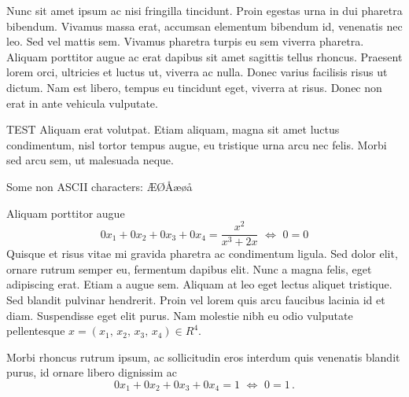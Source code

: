 Nunc sit amet ipsum ac nisi fringilla tincidunt. Proin egestas urna in dui pharetra bibendum. Vivamus massa erat, accumsan elementum bibendum id, venenatis nec leo. Sed vel mattis sem. Vivamus pharetra turpis eu sem viverra pharetra. Aliquam porttitor augue ac erat dapibus sit amet sagittis tellus rhoncus. Praesent lorem orci, ultricies et luctus ut, viverra ac nulla. Donec varius facilisis risus ut dictum. Nam est libero, tempus eu tincidunt eget, viverra at risus. Donec non erat in ante vehicula vulputate.

TEST Aliquam erat volutpat. Etiam aliquam, magna sit amet luctus condimentum, nisl tortor tempus augue, eu tristique urna arcu nec felis. Morbi sed arcu sem, ut malesuada neque.

Some non ASCII characters: ÆØÅæøå

\begin{example}\label{myexample.1}
Aliquam porttitor augue
\begin{equation}
0x_1+0x_2+0x_3+0x_4= \frac{x^2}{x^3+2x}\,\,\Leftrightarrow\,\,0=0
\end{equation}
Quisque et risus vitae mi gravida pharetra ac condimentum ligula. Sed dolor elit, ornare rutrum semper eu, fermentum dapibus elit. Nunc a magna felis, eget adipiscing erat. Etiam a augue sem. Aliquam at leo eget lectus aliquet tristique. Sed blandit pulvinar hendrerit. Proin vel lorem quis arcu faucibus lacinia id et diam. Suspendisse eget elit purus. Nam molestie nibh eu odio vulputate pellentesque $x=(x_1,\,x_2,\,x_3,\,x_4) \in R^4$.

Morbi rhoncus rutrum ipsum, ac sollicitudin eros interdum quis  venenatis blandit purus, id ornare libero dignissim ac
\begin{equation}
0x_1+0x_2+0x_3+0x_4=1\,\,\Leftrightarrow\,\,0=1\,.
\end{equation}
\end{example}

